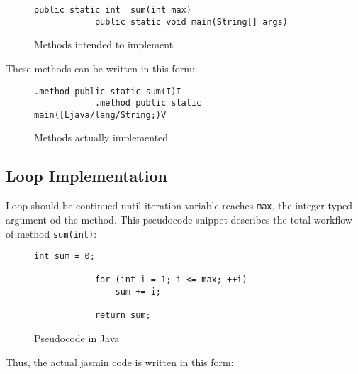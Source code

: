 \documentclass[a4paper, 12pt]{article}
\begin{document}
        \begin{figure}[H]
            \begin{lstlisting}[gobble=8]
            public static int  sum(int max)
            public static void main(String[] args)
            \end{lstlisting}
    
            \centering        
            \caption{Methods intended to implement}
        \end{figure}

        These methods can be written in this form:

        \begin{figure}[H]
            \begin{lstlisting}[gobble=8]
            .method public static sum(I)I
            .method public static main([Ljava/lang/String;)V
            \end{lstlisting}
    
            \centering        
            \caption{Methods actually implemented}
        \end{figure}

        \subsection{Loop Implementation}
        Loop should be continued until iteration variable reaches \texttt{max}, the integer typed argument od the method. This pseudocode snippet describes the total workflow of method \texttt{sum(int)}:
        \begin{figure}[H]
            \begin{lstlisting}[gobble=8]
            int sum = 0;

            for (int i = 1; i <= max; ++i) 
                sum += i;

            return sum;
            \end{lstlisting}
    
            \centering        
            \caption{Pseudocode in Java}
        \end{figure}

        Thus, the actual jasmin code is written in this form:
\end{document}
